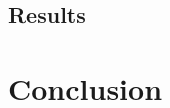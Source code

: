 \documentclass[sigconf]{acmart}
\begin{document}
\subsection{Results}
\section{Conclusion}


\end{document}
